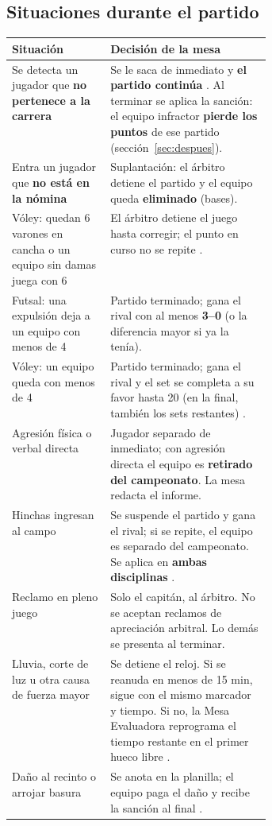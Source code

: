 \subsection{Situaciones durante el partido}
\renewcommand{\arraystretch}{1.3}
\noindent\begin{tabularx}{\linewidth}{>{\RaggedRight\arraybackslash}p{0.38\linewidth} >{\RaggedRight\arraybackslash}X}
	\textbf{Situación} & \textbf{Decisión de la mesa}\\ \hline
	Se detecta un jugador que \textbf{no pertenece a la carrera} & Se le saca de inmediato y \textbf{el partido continúa} \crit{6}. Al terminar se aplica la sanción: el equipo infractor \textbf{pierde los puntos} de ese partido (sección~\ref{sec:despues}).\\
	Entra un jugador que \textbf{no está en la nómina} & Suplantación: el árbitro detiene el partido y el equipo queda \textbf{eliminado} (bases).\\
	Vóley: quedan 6 varones en cancha o un equipo sin damas juega con 6 & El árbitro detiene el juego hasta corregir; el punto en curso no se repite \crit{7}.\\
	Futsal: una expulsión deja a un equipo con menos de 4 & Partido terminado; gana el rival con al menos \textbf{3--0} (o la diferencia mayor si ya la tenía).\\
	Vóley: un equipo queda con menos de 4 & Partido terminado; gana el rival y el set se completa a su favor hasta 20 (en la final, también los sets restantes) \crit{8}.\\
	Agresión física o verbal directa & Jugador separado de inmediato; con agresión directa el equipo es \textbf{retirado del campeonato}. La mesa redacta el informe.\\
	Hinchas ingresan al campo & Se suspende el partido y gana el rival; si se repite, el equipo es separado del campeonato. Se aplica en \textbf{ambas disciplinas} \crit{9}.\\
	Reclamo en pleno juego & Solo el capitán, al árbitro. No se aceptan reclamos de apreciación arbitral. Lo demás se presenta al terminar.\\
	Lluvia, corte de luz u otra causa de fuerza mayor & Se detiene el reloj. Si se reanuda en menos de 15 min, sigue con el mismo marcador y tiempo. Si no, la Mesa Evaluadora reprograma el tiempo restante en el primer hueco libre \crit{10}.\\
	Daño al recinto o arrojar basura & Se anota en la planilla; el equipo paga el daño y recibe la sanción al final \crit{11}.\\
\end{tabularx}


